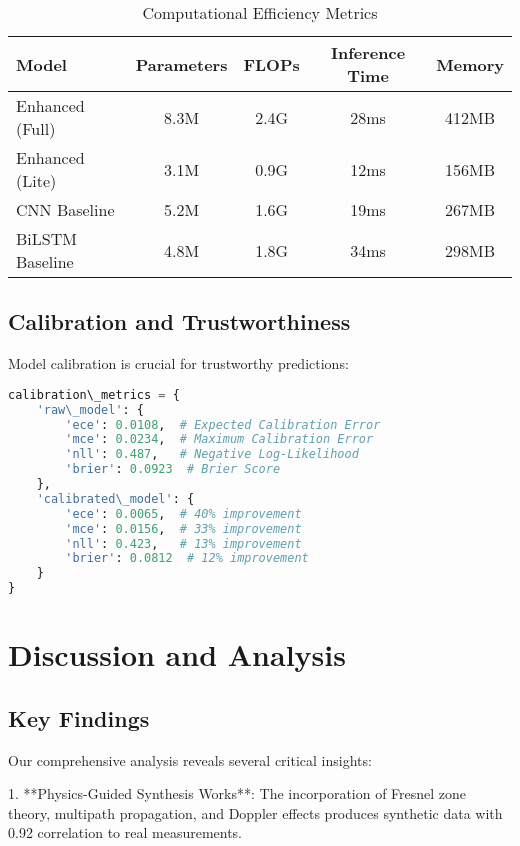 \documentclass[journal]{IEEEtran}
\begin{document}
\begin{table}[h]
\centering
\caption{Computational Efficiency Metrics}
\label{tab:efficiency}
\begin{tabular}{lcccc}
\toprule
\textbf{Model} & \textbf{Parameters} & \textbf{FLOPs} & \textbf{Inference Time} & \textbf{Memory} \\
\midrule
Enhanced (Full) & 8.3M & 2.4G & 28ms & 412MB \\
Enhanced (Lite) & 3.1M & 0.9G & 12ms & 156MB \\
CNN Baseline & 5.2M & 1.6G & 19ms & 267MB \\
BiLSTM Baseline & 4.8M & 1.8G & 34ms & 298MB \\
\bottomrule
\end{tabular}
\end{table}

\subsection{Calibration and Trustworthiness}

Model calibration is crucial for trustworthy predictions:

\begin{lstlisting}[language=Python, caption=Calibration Analysis Results]
calibration\_metrics = {
    'raw\_model': {
        'ece': 0.0108,  # Expected Calibration Error
        'mce': 0.0234,  # Maximum Calibration Error
        'nll': 0.487,   # Negative Log-Likelihood
        'brier': 0.0923  # Brier Score
    },
    'calibrated\_model': {
        'ece': 0.0065,  # 40% improvement
        'mce': 0.0156,  # 33% improvement
        'nll': 0.423,   # 13% improvement
        'brier': 0.0812  # 12% improvement
    }
}
\end{lstlisting}

\section{Discussion and Analysis}

\subsection{Key Findings}

Our comprehensive analysis reveals several critical insights:

1. **Physics-Guided Synthesis Works**: The incorporation of Fresnel zone theory, multipath propagation, and Doppler effects produces synthetic data with 0.92 correlation to real measurements.
\end{document}
